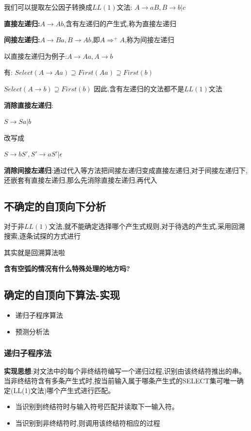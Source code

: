 \documentclass[UTF8,a4paper]{ctexart}
\newcommand{\spaceline}{\vspace{\baselineskip}}
\begin{document}
 我们可以提取左公因子转换成$LL(1)$文法:
$A\to aB , B\to b|c$

\spaceline
 \textbf{直接左递归:}$A \to Ab$,含有左递归的产生式,称为直接左递归

 \textbf{间接左递归:}$A\to Ba  , B \to Ab$,即$A\Rightarrow^+ A$,称为间接左递归

 \spaceline
 以直接左递归为例子:$A \to Aa, A \to b$

 有:
$Select(A\to Aa) \supseteq First(Aa) \supseteq First(b)$

$Select(A\to b)\supseteq First(b)$
 因此,含有左递归的文法都不是$LL(1)$文法

 \textbf{消除直接左递归}:

$S\to Sa|b$

 改写成

$S\to bS' , S' \to aS' | \epsilon$

 \textbf{消除间接左递归}:通过代入等方法把间接左递归变成直接左递归,对于间接左递归下,还嵌套有直接左递归,那么先消除直接左递归,再代入

 \subsection{不确定的自顶向下分析}
 对于非$LL(1)$文法,就不能确定选择哪个产生式规则,对于待选的产生式,采用回溯搜索,逐条试探的方式进行

 其实就是回溯算法啦

 \textbf{含有空弧的情况有什么特殊处理的地方吗?}

 \subsection{确定的自顶向下算法-实现}
 \begin{itemize}
  \item 递归子程序算法
  \item 预测分析法
 \end{itemize}

 \subsubsection{递归子程序法}
 \textbf{实现思想}:对文法中的每个非终结符编写一个递归过程,识别由该终结符推出的串。当非终结符含有多条产生式时,按当前输入属于哪条产生式的SELECT集可唯一确定(LL(1)文法)哪个产生式进行匹配。

 \begin{itemize}
  \item 当识别到终结符时与输入符号匹配并读取下一输入符。
  \item 当识别到非终结符时,则调用该终结符相应的过程
 \end{itemize}
\end{document}
